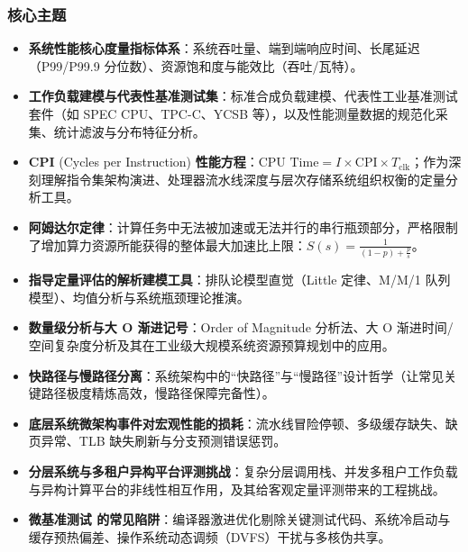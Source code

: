 \subsubsection{核心主题}
\begin{itemize}
    \item \textbf{系统性能核心度量指标体系}：系统吞吐量、端到端响应时间、长尾延迟（P99/P99.9 分位数）、资源饱和度与能效比（吞吐/瓦特）。
    \item \textbf{工作负载建模与代表性基准测试集}：标准合成负载建模、代表性工业基准测试套件（如 SPEC CPU、TPC-C、YCSB 等），以及性能测量数据的规范化采集、统计滤波与分布特征分析。
    \item \textbf{CPI} (Cycles per Instruction) \textbf{性能方程}：$\text{CPU Time} = I \times \text{CPI} \times T_{\text{clk}}$；作为深刻理解指令集架构演进、处理器流水线深度与层次存储系统组织权衡的定量分析工具。
    \item \textbf{阿姆达尔定律}：计算任务中无法被加速或无法并行的串行瓶颈部分，严格限制了增加算力资源所能获得的整体最大加速比上限：$S(s) = \frac{1}{(1-p) + \frac{p}{s}}$。
    \item \textbf{指导定量评估的解析建模工具}：排队论模型直觉（Little 定律、M/M/1 队列模型）、均值分析与系统瓶颈理论推演。
    \item \textbf{数量级分析与大 O 渐进记号}：Order of Magnitude 分析法、大 O 渐进时间/空间复杂度分析及其在工业级大规模系统资源预算规划中的应用。
    \item \textbf{快路径与慢路径分离}：系统架构中的“快路径”与“慢路径”设计哲学（让常见关键路径极度精炼高效，慢路径保障完备性）。
    \item \textbf{底层系统微架构事件对宏观性能的损耗}：流水线冒险停顿、多级缓存缺失、缺页异常、TLB 缺失刷新与分支预测错误惩罚。
    \item \textbf{分层系统与多租户异构平台评测挑战}：复杂分层调用栈、并发多租户工作负载与异构计算平台的非线性相互作用，及其给客观定量评测带来的工程挑战。
    \item \textbf{微基准测试 的常见陷阱}：编译器激进优化剔除关键测试代码、系统冷启动与缓存预热偏差、操作系统动态调频（DVFS）干扰与多核伪共享。
\end{itemize}


